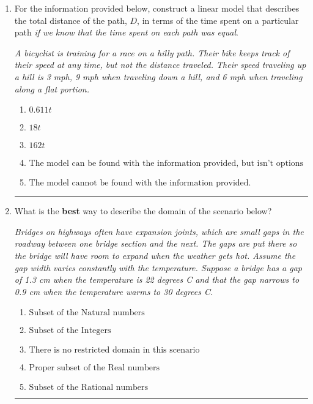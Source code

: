 \documentclass[14pt]{extbook}
\newcommand{\litem}[1]{\item#1\hspace*{-1cm}\rule{\textwidth}{0.4pt}}
\begin{document}
\begin{enumerate}
{\begin{enumerate}[label=\Alph*.]
\end{enumerate} }
\litem{
For the information provided below, construct a linear model that describes the total distance of the path, $D$, in terms of the time spent on a particular path \textit{if we know that the time spent on each path was equal}.
\begin{center}
    \textit{ A bicyclist is training for a race on a hilly path. Their bike keeps track of their speed at any time, but not the distance traveled. Their speed traveling up a hill is 3 mph, 9 mph when traveling down a hill, and 6 mph when traveling along a flat portion. }
\end{center}
\begin{enumerate}[label=\Alph*.]
\item \( 0.611 t \)
\item \( 18 t \)
\item \( 162 t \)
\item \( \text{The model can be found with the information provided, but isn't options 1-3.} \)
\item \( \text{The model cannot be found with the information provided.} \)

\end{enumerate} }
\litem{
What is the \textbf{best} way to describe the domain of the scenario below?
\begin{center}
    \textit{ Bridges on highways often have expansion joints, which are small gaps in the roadway between one bridge section and the next. The gaps are put there so the bridge will have room to expand when the weather gets hot. Assume the gap width varies constantly with the temperature. Suppose a bridge has a gap of 1.3 cm when the temperature is 22 degrees C and that the gap narrows to 0.9 cm when the temperature warms to 30 degrees C. }
\end{center}
\begin{enumerate}[label=\Alph*.]
\item \( \text{Subset of the Natural numbers} \)
\item \( \text{Subset of the Integers} \)
\item \( \text{There is no restricted domain in this scenario} \)
\item \( \text{Proper subset of the Real numbers} \)
\item \( \text{Subset of the Rational numbers} \)


\end{enumerate}}
\end{enumerate}
\end{document}
